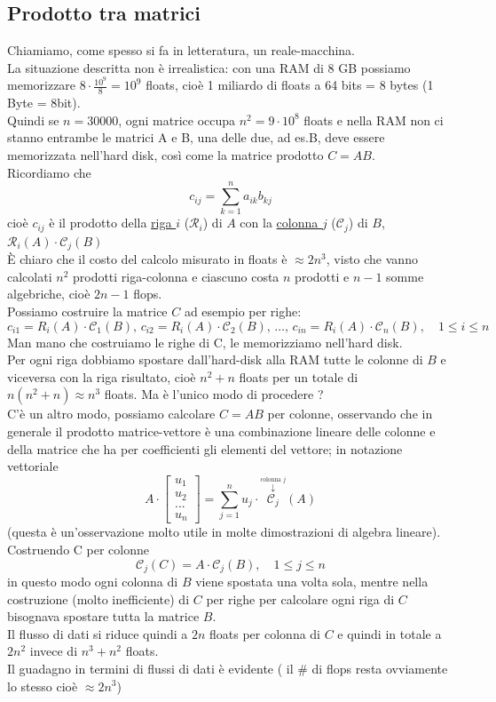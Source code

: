 \documentclass[12pt]{article}
\begin{document}
\subsection{Prodotto tra matrici}
Chiamiamo, come spesso si fa in letteratura,  un reale-macchina.\\
La situazione descritta non è irrealistica: con una RAM di 8 GB possiamo memorizzare $8\cdot \frac{10^9}{8}=10^9$ floats, cioè 1 miliardo di floats a 64 bits = 8 bytes (1 Byte = 8bit).\\
Quindi se $n=30000$, ogni matrice occupa $n^2=9\cdot 10^8$ floats e nella RAM non ci stanno entrambe le matrici A e B, una delle due, ad es.B, deve essere memorizzata nell'hard disk, così come la matrice prodotto $C=AB$.\\
Ricordiamo che 
\[ c_{ij}=\sum_{k=1}^n a_{ik}b_{kj} \]
cioè $c_{ij}$ è il prodotto della \uline{riga $i$} ($\mathcal{R}_{i}$) di $A$ con la \uline{colonna $j$} ($\mathcal{C}_{j}$) di $B$, $\mathcal{R}_{i}(A)\cdot \mathcal{C}_{j}(B)$\\
È chiaro che il costo del calcolo misurato in floats è $\approx 2n^3$, visto che vanno calcolati $n^2$ prodotti riga-colonna e ciascuno costa $n$ prodotti e $n-1$ somme algebriche, cioè $2n-1$ flops. \\
Possiamo costruire la matrice $C$ ad esempio per righe: \\
\[c_{i1} = R_i(A)\cdot\mathcal{C}_1(B),\,c_{i2} = R_i(A)\cdot\mathcal{C}_2(B),\, \dotsc ,\, c_{in} = R_i(A)\cdot\mathcal{C}_n(B),\quad 1 \le i \le n\]
Man mano che costruiamo le righe di C, le memorizziamo nell'hard disk. \\
Per ogni riga dobbiamo spostare dall'hard-disk alla RAM tutte le colonne di $B$ e viceversa con la riga risultato, cioè $n^2+n$ floats per un totale di $n(n^2+n) \approx n^3$ floats. Ma è l'unico modo di procedere ? \\
C'è un altro modo, possiamo calcolare $C=AB$ per colonne, osservando che in generale il prodotto matrice-vettore è una combinazione lineare delle colonne e della matrice che ha per coefficienti gli elementi del vettore; in notazione vettoriale \\
\[A \cdot \begin{bmatrix} u_1 \\ u_2 \\ ... \\ u_n \end{bmatrix} = \sum_{j=1}^{n} u_j \cdot \overset{\overset{\text{colonna $j$}}{\downarrow}}{\mathcal{C}_j}(A) \]
(questa è un'osservazione molto utile in molte dimostrazioni di algebra lineare).\\
Costruendo C per colonne 
\[\mathcal{C}_j(C) = A\cdot \mathcal{C}_j(B),\quad 1 \le j \le n\]
in questo modo ogni colonna di $B$ viene spostata una volta sola, mentre nella costruzione (molto inefficiente) di $C$ per righe per calcolare ogni riga di $C$ bisognava spostare tutta la matrice $B$.\\
Il flusso di dati si riduce quindi a $2n$ floats per colonna di $C$ e quindi in totale a $2n^2$ invece di $n^3+n^2$ floats.\\
Il guadagno in termini di flussi di dati è evidente ( il \# di flops resta ovviamente lo stesso cioè $\approx 2n^3$)
\end{document}
